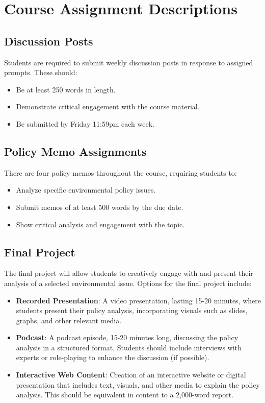 \documentclass[12pt, letterpaper]{article}
\begin{document}
\section*{Course Assignment Descriptions}

\subsection*{Discussion Posts}
Students are required to submit weekly discussion posts in response to assigned prompts. These should:
\begin{itemize}
    \item Be at least 250 words in length.
    \item Demonstrate critical engagement with the course material.
    \item Be submitted by Friday 11:59pm each week.
\end{itemize}

\subsection*{Policy Memo Assignments}
There are four policy memos throughout the course, requiring students to:
\begin{itemize}
    \item Analyze specific environmental policy issues.
    \item Submit memos of at least 500 words by the due date.
    \item Show critical analysis and engagement with the topic.
\end{itemize}

\subsection*{Final Project}
The final project will allow students to creatively engage with and present their analysis of a selected environmental issue. Options for the final project include:

\begin{itemize}
    \item \textbf{Recorded Presentation}: A video presentation, lasting 15-20 minutes, where students present their policy analysis, incorporating visuals such as slides, graphs, and other relevant media.
    \item \textbf{Podcast}: A podcast episode, 15-20 minutes long, discussing the policy analysis in a structured format. Students should include interviews with experts or role-playing to enhance the discussion (if possible).
    \item \textbf{Interactive Web Content}: Creation of an interactive website or digital presentation that includes text, visuals, and other media to explain the policy analysis. This should be equivalent in content to a 2,000-word report.
\end{itemize}
\end{document}

